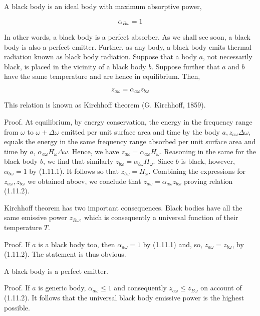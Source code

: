 \documentclass{article}
\begin{document}
A black body is an ideal body with maximum absorptive power,
 
\begin{equation*}
\alpha_{B \omega}=1 \tag{1.11.1}
\end{equation*}
 

In other words, a black body is a perfect absorber. As we shall see soon, a black body is also a perfect emitter. Further, as any body, a black body emits thermal
radiation known as black body radiation.
Suppose that a body $a$, not necessarily black, is placed in the vicinity of a black body $b$. Suppose further that $a$ and $b$ have the same temperature and are hence in equilibrium. Then,
 
\begin{equation*}
z_{a \omega}=\alpha_{a \omega} z_{b \omega} \tag{1.11.2}
\end{equation*}
 

This relation is known as Kirchhoff theorem (G. Kirchhoff, 1859).

Proof. At equilibrium, by energy conservation, the energy in the frequency range from $\omega$ to $\omega+\Delta \omega$ emitted per unit surface area and time by the body $a, z_{a \omega} \Delta \omega$, equals the energy in the same frequency range absorbed per unit surface area and time by $a$, $\alpha_{a \omega} H_{\omega} \Delta \omega$. Hence, we have $z_{a \omega}=\alpha_{a \omega} H_{\omega}$. Reasoning in the same for the black body $b$, we find that similarly $z_{b \omega}=\alpha_{b \omega} H_{\omega}$. Since $b$ is black, however, $\alpha_{b \omega}=1$ by (1.11.1). It follows so that $z_{b \omega}=H_{\omega}$. Combining the expressions for $z_{a \omega}, z_{b \omega}$ we obtained aboev, we conclude that $z_{a \omega}=\alpha_{a \omega} z_{b \omega}$ proving relation (1.11.2).

Kirchhoff theorem has two important consequences.
Black bodies have all the same emissive power $z_{B \omega}$, which is consequently a universal function of their temperature $T$.

Proof. If $a$ is a black body too, then $\alpha_{a \omega}=1$ by (1.11.1) and, so, $z_{a \omega}=z_{b \omega}$, by (1.11.2). The statement is thus obvious.

A black body is a perfect emitter.

Proof. If $a$ is generic body, $\alpha_{a \omega} \leq 1$ and consequently $z_{a \omega} \leq z_{B \omega}$ on account of (1.11.2). It follows that the universal black body emissive power is the highest possible.
\end{document}
